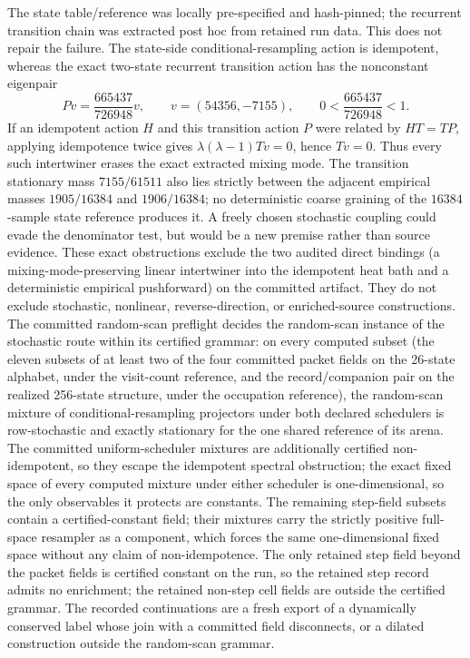\documentclass[11pt]{article}
\begin{document}
The state table/reference was locally pre-specified and hash-pinned; the
recurrent transition chain was extracted post hoc from retained run data.
This does not repair the failure. The
state-side conditional-resampling action is idempotent, whereas the exact
two-state recurrent transition action has the nonconstant eigenpair
\[
 P v=\frac{665437}{726948}v,\qquad
 v=(54356,-7155),\qquad 0<\frac{665437}{726948}<1.
\]
If an idempotent action \(H\) and this transition action \(P\) were related by
\(HT=TP\), applying idempotence twice gives
\(\lambda(\lambda-1)Tv=0\), hence \(Tv=0\). Thus every such intertwiner erases
the exact extracted mixing mode. The transition stationary mass
\(7155/61511\) also lies strictly between the adjacent empirical masses
\(1905/16384\) and \(1906/16384\); no deterministic coarse graining of the
\(16384\)-sample state reference produces it. A freely chosen stochastic
coupling could evade the denominator test, but would be a new premise rather
than source evidence. These exact obstructions exclude the two audited direct
bindings (a mixing-mode-preserving linear intertwiner into the idempotent
heat bath and a deterministic empirical pushforward) on the committed
artifact. They do not exclude stochastic, nonlinear, reverse-direction, or
enriched-source constructions. The committed random-scan preflight decides
the random-scan instance of the stochastic route within its certified
grammar: on every computed subset (the eleven subsets of at least two of
the four committed packet fields on the 26-state alphabet, under the
visit-count reference, and the record/companion pair on the realized
256-state structure, under the occupation reference), the random-scan
mixture of conditional-resampling projectors under both declared schedulers
is row-stochastic and exactly stationary for the one shared reference of its
arena. The committed uniform-scheduler mixtures are additionally certified
non-idempotent, so they escape the idempotent spectral obstruction; the exact
fixed space of every computed mixture under either scheduler is
one-dimensional, so the only observables it protects are constants. The
remaining step-field subsets contain a certified-constant field; their
mixtures carry the strictly positive full-space resampler as a component,
which forces the same one-dimensional fixed space without any claim of
non-idempotence. The only retained step field beyond the packet fields is
certified constant on the run, so the retained step record admits no
enrichment; the retained non-step cell fields are outside the certified
grammar. The recorded continuations are a fresh export of a dynamically
conserved label whose join with a committed field disconnects, or a dilated
construction outside the random-scan grammar.
\end{document}
